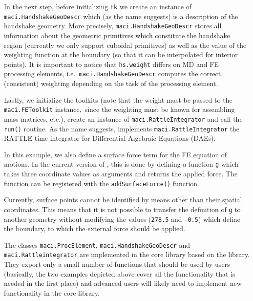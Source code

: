 In the next step, before initializing \lstinline[style=PYTHON]|tk| we create an instance of \lstinline[style=PYTHON]|maci.HandshakeGeoDescr| which (as the name suggests) is a description of the handshake geometry. More precisely, \lstinline[style=PYTHON]|maci.HandshakeGeoDescr| stores all information about the geometric primitives which constitute the handshake region (currently we only support cuboidal primitives) as well as the value of the weighting function at the boundary (so that it can be interpolated for interior points). It is important to notice that \lstinline[style=PYTHON]|hs.weight| differs on MD and FE processing elements, i.e.~\lstinline[style=PYTHON]|maci.HandshakeGeoDescr| computes the correct (consistent) weighting depending on the task of the processing element.\newline

Lastly, we initialize the toolkits (note that the weight must be passed to the \lstinline[style=PYTHON]|maci.FEToolkit| instance,~since the weighting must be known for assembling mass matrices, etc.), create an instance of \lstinline[style=PYTHON]|maci.RattleIntegrator| and call the \lstinline[style=PYTHON]|run()| routine. As the name suggests, implements \lstinline[style=PYTHON]|maci.RattleIntegrator| the RATTLE time integrator for Differential Algebraic Equations (DAEs).\newline

In this example, we also define a surface force term for the FE equation of motions. In the current version of \MACI, this is done by defining a function \lstinline[style=PYTHON]|g| which takes three coordinate values as arguments and returns the applied force. The function can be registered with the \lstinline[style=PYTHON]|addSurfaceForce()| function.

Currently, surface points cannot be identified by means other than their spatial coordinates. This means that it is not possible to transfer the definition of \lstinline[style=PYTHON]|g| to another geometry without modifying the values (\lstinline[style=PYTHON]|278.5| and \lstinline[style=PYTHON]|-0.5|) which define the boundary, to which the external force should be applied.\newline

The classes \lstinline[style=PYTHON]|maci.ProcElement|, \lstinline[style=PYTHON]|maci.HandshakeGeoDescr| and \lstinline[style=PYTHON]|maci.RattleIntegrator| are implemented in the core library based on the \MACI \CPP library. They export only a small number of functions that should be used by users (basically, the two examples depicted above cover all the functionality that is needed in the first place) and advanced users will likely need to implement new functionality in the \MACI core library.

